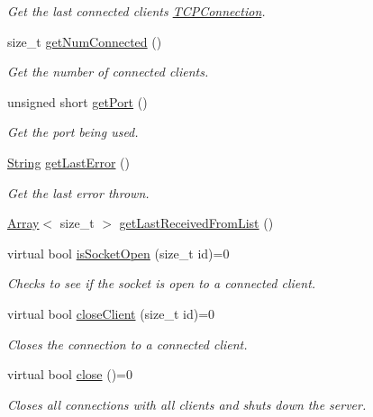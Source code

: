 \begin{DoxyCompactItemize}
\begin{DoxyCompactList}\small\item\em Get the last connected client\textquotesingle{}s \mbox{\hyperlink{class_rad_j_a_v_1_1_networking_1_1_t_c_p_connection}{T\+C\+P\+Connection}}. \end{DoxyCompactList}\item 
size\+\_\+t \mbox{\hyperlink{class_rad_j_a_v_1_1_networking_1_1_tcpip_server_aefb102dc6cfdccde795918ff3d70c5d8}{get\+Num\+Connected}} ()
\begin{DoxyCompactList}\small\item\em Get the number of connected clients. \end{DoxyCompactList}\item 
unsigned short \mbox{\hyperlink{class_rad_j_a_v_1_1_networking_1_1_tcpip_server_a27aecbe03f731d38e635dc1e8cbe7130}{get\+Port}} ()
\begin{DoxyCompactList}\small\item\em Get the port being used. \end{DoxyCompactList}\item 
\mbox{\hyperlink{class_rad_j_a_v_1_1_string}{String}} \mbox{\hyperlink{class_rad_j_a_v_1_1_networking_1_1_tcpip_server_a08fbc1566fc5e913bccdb1d4e392bdd5}{get\+Last\+Error}} ()
\begin{DoxyCompactList}\small\item\em Get the last error thrown. \end{DoxyCompactList}\item 
\mbox{\hyperlink{class_rad_j_a_v_1_1_array}{Array}}$<$ size\+\_\+t $>$ \mbox{\hyperlink{class_rad_j_a_v_1_1_networking_1_1_tcpip_server_aff3f82d45d35c2006f3e6e88f996d045}{get\+Last\+Received\+From\+List}} ()
\item 
virtual bool \mbox{\hyperlink{class_rad_j_a_v_1_1_networking_1_1_tcpip_server_a7559c8bec30b88e6e86dc49d9a8df158}{is\+Socket\+Open}} (size\+\_\+t id)=0
\begin{DoxyCompactList}\small\item\em Checks to see if the socket is open to a connected client. \end{DoxyCompactList}\item 
virtual bool \mbox{\hyperlink{class_rad_j_a_v_1_1_networking_1_1_tcpip_server_ada8defc3c9feb91b64371199eac4787c}{close\+Client}} (size\+\_\+t id)=0
\begin{DoxyCompactList}\small\item\em Closes the connection to a connected client. \end{DoxyCompactList}\item 
virtual bool \mbox{\hyperlink{class_rad_j_a_v_1_1_networking_1_1_tcpip_server_adc98bbb81534697c37b6c30662fe43dc}{close}} ()=0
\begin{DoxyCompactList}\small\item\em Closes all connections with all clients and shuts down the server. \end{DoxyCompactList}\end{DoxyCompactItemize}


